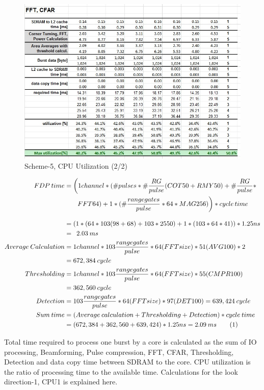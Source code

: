 \begin{figure}[h!]
	\centering
	\includegraphics[width=160mm]{figures/scheme5_cpu_util2}
	\caption{Scheme-5, CPU Utilization (2/2)}
	\label{fig:mm:scheme5_cpu_util2}
\end{figure}

\begin{align*}
	FDP \: time &= \bigg(1channel * (\#pulses * \# \frac{RG}{pulse} (COT50 + RMY50) + \# \frac{RG}{pulse} * \\
		& \qquad FFT64) + 1 * (\# \frac{range gates}{pulse} * 64 * MAG256)\bigg) * cycle \, time \\[0.3cm]
		&= (1 * (64 * 103 (98 + 68) + 103 * 2550) + 1 * (103 * 64 * 41)) * 1.25ns \\
		&= \enspace 2.03 \: ms \\
		Average \: Calculation &= 1channel * 103 \frac{range gates}{pulse} * 64(FFTsize) * 51(AVG100) * 2 \\
		&=  672,384 \: cycle \\
		Thresholding &= 1channel * 103 \frac{range gates}{pulse} * 64(FFTsize) * 55(CMPR100) \\
		&= 362,560 \: cycle \\
		Detection &= 103 \frac{range gates}{pulse} * 64(FFTsize) * 97(DET100) = 639,424 \: cycle \\
		Sum \: time &= (Average \: calculation + Thresholding + Detection) * cycle \: time \\
		&= (672,384 + 362,560 + 639,424) * 1.25ns = 2.09 \: ms	\stepcounter{equation}\tag{\theequation} 
\end{align*}

Total time required to process one burst by a core is calculated as the sum of IO processing, Beamforming, Pulse compression, FFT, CFAR, Thresholding, Detection and data copy time between SDRAM to the core. CPU utilization is the ratio of processing time to the available time. Calculations for the look direction-1, CPU1 is explained here.

